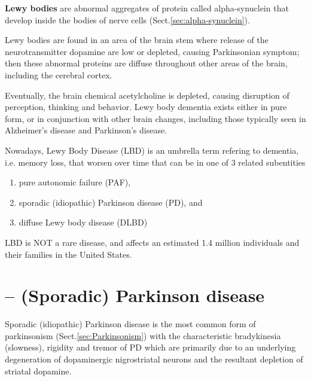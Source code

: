 {\bf Lewy bodies} are abnormal aggregates of protein called alpha-synuclein that
develop inside the bodies of nerve cells (Sect.\ref{sec:alpha-synuclein}). 

Lewy bodies are found in an area of the brain stem where release of the
neurotransmitter dopamine are low or depleted, causing Parkinsonian symptom;
then these abnormal proteins are diffuse throughout other areas of the brain,
including the cerebral cortex.

Eventually, the brain chemical acetylcholine is depleted, causing disruption of
perception, thinking and behavior. Lewy body dementia exists either in pure
form, or in conjunction with other brain changes, including those typically seen
in Alzheimer's disease and Parkinson's disease.

Nowadays, Lewy Body Disease (LBD) is an umbrella term refering to dementia, i.e.
memory loss, that worsen over time that can be in one of 3 related subentities
\begin{enumerate}
  
  \item pure autonomic failure (PAF), 
  
  \item sporadic (idiopathic) Parkinson disease (PD), and  
  
  \item diffuse Lewy body disease (DLBD)
  
\end{enumerate}

LBD is NOT a rare disease, and affects an estimated 1.4 million individuals
and their families in the United States.


% 
  
  
\section{-- (Sporadic) Parkinson disease}
\label{sec:Parkinson-disease}


Sporadic (idiopathic) Parkinson disease is the most common form of parkinsonism
(Sect.\ref{sec:Parkinsonism}) with the characteristic bradykinesia (slowness),
rigidity and tremor of PD which are primarily due to an underlying degeneration
of dopaminergic nigrostriatal neurons and the resultant depletion of striatal
dopamine.


